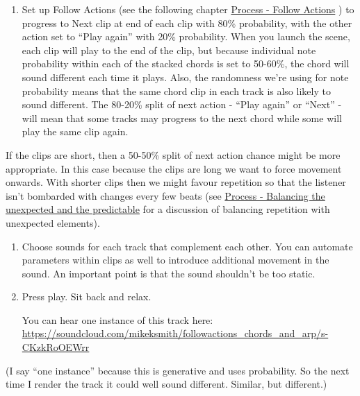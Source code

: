 \documentclass[
  12pt,
  letterpaper,
  oneside,
  open=any]{scrbook}
\providecommand{\tightlist}{%
  \setlength{\itemsep}{0pt}\setlength{\parskip}{0pt}}\usepackage{longtable,booktabs,array}
\begin{document}
\begin{enumerate}
\def\labelenumi{\arabic{enumi}.}
\setcounter{enumi}{6}
\tightlist
\item
  Set up Follow Actions (see the following chapter
  \hyperref[Chapter-003-Process-Follow_Actions]{Process - Follow
  Actions} ) to progress to Next clip at end of each clip with 80\%
  probability, with the other action set to ``Play again'' with 20\%
  probability. When you launch the scene, each clip will play to the end
  of the clip, but because individual note probability within each of
  the stacked chords is set to 50-60\%, the chord will sound different
  each time it plays. Also, the randomness we're using for note
  probability means that the same chord clip in each track is also
  likely to sound different. The 80-20\% split of next action - ``Play
  again'' or ``Next'' - will mean that some tracks may progress to the
  next chord while some will play the same clip again.
\end{enumerate}

If the clips are short, then a 50-50\% split of next action chance might
be more appropriate. In this case because the clips are long we want to
force movement onwards. With shorter clips then we might favour
repetition so that the listener isn't bombarded with changes every few
beats (see
\hyperref[Chapter-009-Process-Balance_unexpected_and_predictable]{Process
- Balancing the unexpected and the predictable} for a discussion of
balancing repetition with unexpected elements).

\begin{enumerate}
\def\labelenumi{\arabic{enumi}.}
\setcounter{enumi}{7}
\item
  Choose sounds for each track that complement each other. You can
  automate parameters within clips as well to introduce additional
  movement in the sound. An important point is that the sound shouldn't
  be too static.
\item
  Press play. Sit back and relax.

  You can hear one instance of this track here:
  \href{https://soundcloud.com/mikeksmith/followactions_chords_and_arp/s-CKzkRoOEWrr?in=mikeksmith/sets/the-lazy-producer-recipes/s-PGMEWqfwKGz&si=e1846c9235ff47ad9ae0fa0cd5d52708&utm_source=clipboard&utm_medium=text&utm_campaign=social_sharing}{https://soundcloud.com/mikeksmith/followactions\_chords\_and\_arp/s-CKzkRoOEWrr}
\end{enumerate}

(I say ``one instance'' because this is generative and uses probability.
So the next time I render the track it could well sound different.
Similar, but different.)
\end{document}
